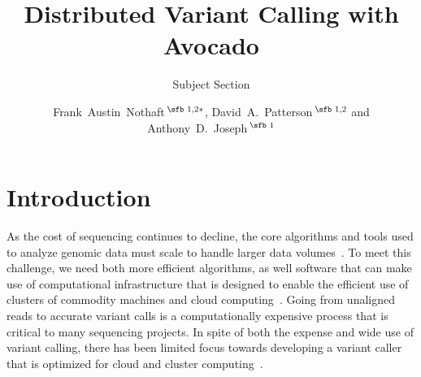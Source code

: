 \documentclass{bioinfo}
\begin{document}

\subtitle{Subject Section}

\title[Distributed Variant Calling with Avocado]{Distributed Variant Calling with Avocado}
\author[Nothaft \textit{et~al}.]{Frank~Austin~Nothaft\,$^{\text{\sfb 1,2}*}$, David~A.~Patterson\,$^{\text{\sfb 1,2}}$ and Anthony~D.~Joseph\,$^{\text{\sfb 1}}$}
\address{$^{\text{\sf 1}}$AMPLab, University of California, Berkeley, 94720, USA and \\
$^{\text{\sf 2}}$ASPIRE Lab, University of California, Berkeley, 94720, USA.}





\maketitle

\section{Introduction}
\label{sec:introduction}

As the cost of sequencing continues to decline, the core algorithms and tools used
to analyze genomic data must scale to handle larger data volumes~\citep{muir16}.
To meet this challenge, we need both more efficient algorithms, as well software
that can make use of computational infrastructure that is designed to enable the
efficient use of clusters of commodity machines and cloud computing~\cite{schadt10,
nothaft15}. Going from unaligned reads to accurate variant calls is a
computationally expensive process that is critical to many sequencing projects.
In spite of both the expense and wide use of variant calling, there has been
limited focus towards developing a variant caller that is optimized for cloud
and cluster computing~\citep{langmead09crossbow}.
\end{document}
